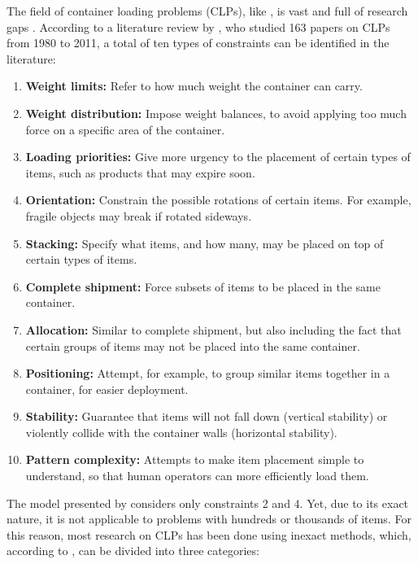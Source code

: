 The field of container loading problems (CLPs), like \cite{CHEN1995}, is vast and full of research gaps \cite{CENTENARO2024}. According to a literature review by \textcite{BORTFELDT2012}, who studied 163 papers on CLPs from 1980 to 2011, a total of ten types of constraints can be identified in the literature:

\begin{enumerate}
    \item \textbf{Weight limits:} Refer to how much weight the container can carry.
    \item \textbf{Weight distribution:} Impose weight balances, to avoid applying too much force on a specific area of the container.
    \item \textbf{Loading priorities:} Give more urgency to the placement of certain types of items, such as products that may expire soon.
    \item \textbf{Orientation:} Constrain the possible rotations of certain items. For example, fragile objects may break if rotated sideways.
    \item \textbf{Stacking:} Specify what items, and how many, may be placed on top of certain types of items.
    \item \textbf{Complete shipment:} Force subsets of items to be placed in the same container.
    \item \textbf{Allocation:} Similar to complete shipment, but also including the fact that certain groups of items may not be placed into the same container.
    \item \textbf{Positioning:} Attempt, for example, to group similar items together in a container, for easier deployment.
    \item \textbf{Stability:} Guarantee that items will not fall down (vertical stability) or violently collide with the container walls (horizontal stability).
    \item \textbf{Pattern complexity:} Attempts to make item placement simple to understand, so that human operators can more efficiently load them.
\end{enumerate}

The model presented by \cite{CHEN1995} considers only constraints 2 and 4. Yet, due to its exact nature, it is not applicable to problems with hundreds or thousands of items. For this reason, most research on CLPs has been done using inexact methods, which, according to \textcite{FANSLAU2010}, can be divided into three categories:


